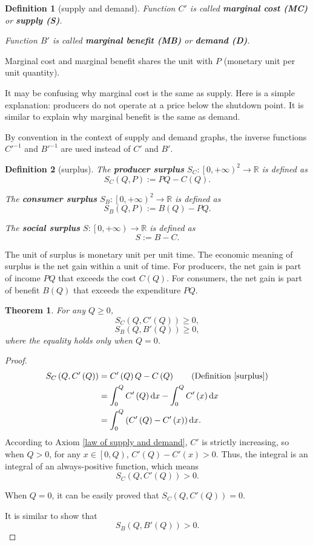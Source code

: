 \documentclass{article}
\newtheorem{theorem}{Theorem}
\newtheorem{definition}{Definition}
\begin{document}
\begin{definition}[supply and demand]
Function $C'$ is called \textbf{marginal cost (MC)} or \textbf{supply (S)}.

Function $B'$ is called \textbf{marginal benefit (MB)} or \textbf{demand (D)}.
\end{definition}

Marginal cost and marginal benefit shares the unit with $P$
(monetary unit per unit quantity).

It may be confusing why marginal cost is the same as supply.
Here is a simple explanation: producers do not operate at a price below the shutdown point.
It is similar to explain why marginal benefit is the same as demand.

By convention in the context of supply and demand graphs, the inverse functions $C'^{-1}$ and $B'^{-1}$ are used instead of $C'$ and $B'$.

\begin{definition}[surplus]
\label{surplus}
The \textbf{producer surplus} $S_C:\left[0,+\infty\right)^2\to\mathbb R$ is defined as
$$S_C\left(Q,P\right):=PQ-C\left(Q\right).$$

The \textbf{consumer surplus} $S_B:\left[0,+\infty\right)^2\to\mathbb R$ is defined as
$$S_B\left(Q,P\right):=B\left(Q\right)-PQ.$$

The \textbf{social surplus} $S:\left[0,+\infty\right)\to\mathbb R$ is defined as
$$S:=B-C.$$
\end{definition}

The unit of surplus is monetary unit per unit time.
The economic meaning of surplus is the net gain within a unit of time.
For producers, the net gain is part of income $PQ$ that exceeds the cost $C\left(Q\right)$.
For consumers, the net gain is part of benefit $B\left(Q\right)$ that exceeds the expenditure $PQ$.

\begin{theorem}
For any $Q\ge0$,
$$S_C\left(Q,C'\left(Q\right)\right)\ge0,$$
$$S_B\left(Q,B'\left(Q\right)\right)\ge0,$$
where the equality holds only when $Q=0$.
\end{theorem}
\begin{proof}
\begin{align*}
S_C\left(Q,C'\left(Q\right)\right)&=C'\left(Q\right)Q-C\left(Q\right)\qquad\text{(Definition \ref{surplus})}\\
&=\int_0^QC'\left(Q\right)\mathrm dx-\int_0^QC'\left(x\right)\mathrm dx\\
&=\int_0^Q\left(C'\left(Q\right)-C'\left(x\right)\right)\mathrm dx.
\end{align*}
According to Axiom \ref{law of supply and demand}, $C'$ is strictly increasing,
so when $Q>0$, for any $x\in\left[0,Q\right)$, $C'\left(Q\right)-C'\left(x\right)>0$.
Thus, the integral is an integral of an always-positive function, which means
$$S_C\left(Q,C'\left(Q\right)\right)>0.$$

When $Q=0$, it can be easily proved that $S_C\left(Q,C'\left(Q\right)\right)=0$.

It is similar to show that $$S_B\left(Q,B'\left(Q\right)\right)>0.$$
\end{proof}
\end{document}
